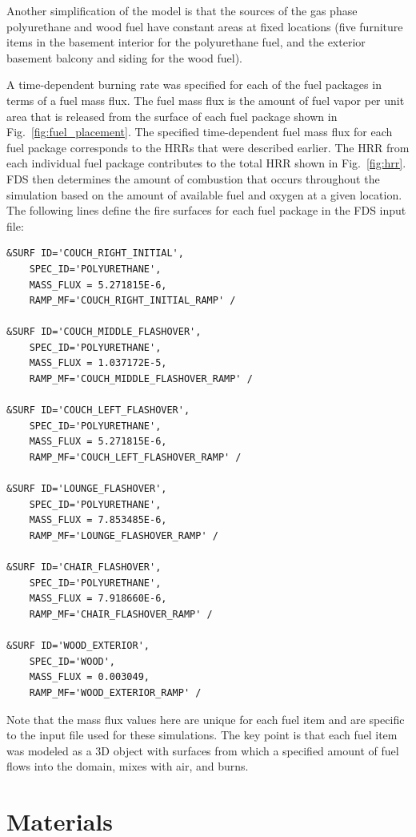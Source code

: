 \documentclass[12pt,oneside]{book}
\begin{document}
Another simplification of the model is that the sources of the gas phase polyurethane and wood fuel have constant areas at fixed locations (five furniture items in the basement interior for the polyurethane fuel, and the exterior basement balcony and siding for the wood fuel).

A time-dependent burning rate was specified for each of the fuel packages in terms of a fuel mass flux. The fuel mass flux is the amount of fuel vapor per unit area that is released from the surface of each fuel package shown in Fig.~\ref{fig:fuel_placement}. The specified time-dependent fuel mass flux for each fuel package corresponds to the HRRs that were described earlier. The HRR from each individual fuel package contributes to the total HRR shown in Fig.~\ref{fig:hrr}. FDS then determines the amount of combustion that occurs throughout the simulation based on the amount of available fuel and oxygen at a given location. The following lines define the fire surfaces for each fuel package in the FDS input file:

\begin{lstlisting}
&SURF ID='COUCH_RIGHT_INITIAL',
    SPEC_ID='POLYURETHANE',
    MASS_FLUX = 5.271815E-6,
    RAMP_MF='COUCH_RIGHT_INITIAL_RAMP' /

&SURF ID='COUCH_MIDDLE_FLASHOVER',
    SPEC_ID='POLYURETHANE',
    MASS_FLUX = 1.037172E-5,
    RAMP_MF='COUCH_MIDDLE_FLASHOVER_RAMP' /

&SURF ID='COUCH_LEFT_FLASHOVER',
    SPEC_ID='POLYURETHANE',
    MASS_FLUX = 5.271815E-6,
    RAMP_MF='COUCH_LEFT_FLASHOVER_RAMP' /

&SURF ID='LOUNGE_FLASHOVER',
    SPEC_ID='POLYURETHANE',
    MASS_FLUX = 7.853485E-6,
    RAMP_MF='LOUNGE_FLASHOVER_RAMP' /

&SURF ID='CHAIR_FLASHOVER',
    SPEC_ID='POLYURETHANE',
    MASS_FLUX = 7.918660E-6,
    RAMP_MF='CHAIR_FLASHOVER_RAMP' /

&SURF ID='WOOD_EXTERIOR',
    SPEC_ID='WOOD',
    MASS_FLUX = 0.003049,
    RAMP_MF='WOOD_EXTERIOR_RAMP' /
\end{lstlisting}

Note that the mass flux values here are unique for each fuel item and are specific to the input file used for these simulations. The key point is that each fuel item was modeled as a 3D object with surfaces from which a specified amount of fuel flows into the domain, mixes with air, and burns.


\clearpage


\section{Materials}
\label{sec:materials}
\end{document}
